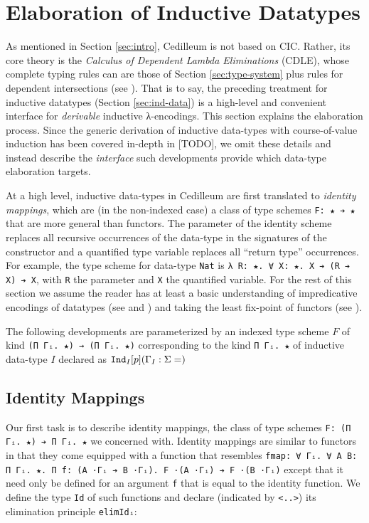 \documentclass{article}
\newcommand{\indast}[5]{\texttt{Ind}_{#1} [#2] (#3 : #4 = #5)}
\begin{document}
\section{Elaboration of Inductive Datatypes}
As mentioned in Section \ref{sec:intro}, Cedilleum is not based on CIC. Rather,
its core theory is the \textit{Calculus of Dependent Lambda Eliminations}
(CDLE), whose complete typing rules can are those of Section
\ref{sec:type-system} plus rules for dependent intersections (see
\cite{St18_Cedille-Syntax-Semantics}). That is to say, the preceding treatment
for inductive datatypes (Section \ref{sec:ind-data}) is a high-level and
convenient interface for \textit{derivable} inductive λ-encodings. This section
explains the elaboration process. Since the generic derivation of inductive
data-types with course-of-value induction has been covered in-depth in [TODO],
we omit these details and instead describe the \textit{interface} such
developments provide which data-type elaboration targets.

At a high level, inductive data-types in Cedilleum are first translated to
\textit{identity mappings}, which are (in the non-indexed case) a class of type
schemes \verb;F: ★ ➔ ★; that are more general than functors. The parameter of
the identity scheme replaces all recursive occurrences of the data-type in the
signatures of the constructor and a quantified type variable replaces all
``return type'' occurrences. For example, the type scheme for data-type
\verb;Nat; is \verb;λ R: ★. ∀ X: ★. X ➔ (R ➔ X) ➔ X;, with \verb;R; the
parameter and \verb;X; the quantified variable. For the rest of this
section we assume the reader has at least a basic understanding of impredicative
encodings of datatypes (see \cite{PP89_Inductive-Types-CC} and
\cite{Wa90_Rec-Types-For-Free}) and taking the least fix-point of functors (see
\cite{MFP91_Bananas-Lenses-Envelopes-Barbed-Wire}).

The following developments are parameterized by an indexed type scheme $F$ of
kind \verb;(Π Γᵢ. ★) → (Π Γᵢ. ★); corresponding to the kind
\verb;Π Γᵢ. ★; of inductive data-type $I$ declared as $\indast{I}{p}{\Gamma_I}{\Sigma}$

\subsection{Identity Mappings}
Our first task is to describe identity mappings, the class of type schemes
\verb;F: (Π Γᵢ. ★) ➔ Π Γᵢ. ★; we concerned with. Identity mappings are similar to functors
in that they come equipped with a function that resembles
\verb;fmap: ∀ Γᵢ. ∀ A B: Π Γᵢ. ★. Π f: (A ·Γᵢ ➔ B ·Γᵢ). F ·(A ·Γᵢ) ➔ F ·(B ·Γᵢ);
except that it need only be defined for an argument \verb;f; that is equal to the
identity function. We define the type \verb;Id; of such functions and declare
(indicated by \verb;<..>;) its elimination principle \verb;elimIdᵢ;:
\end{document}

